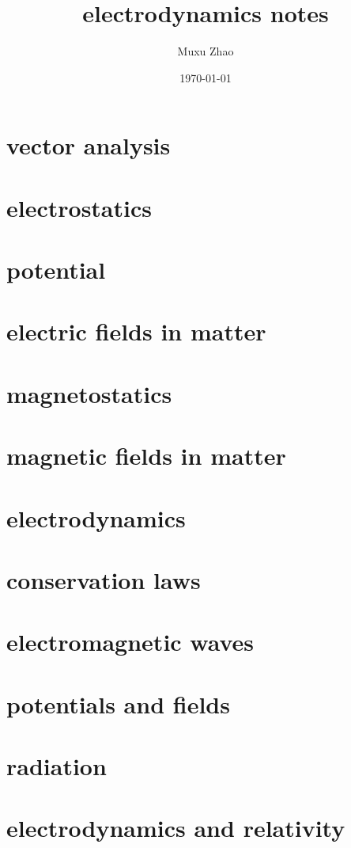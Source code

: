 \documentclass{article}
\title{electrodynamics notes}
\author{Muxu Zhao}
\date{\today}
\begin{document}
\linespread{2.0}
\large
\tableofcontents

\newpage
\section{vector analysis}

\newpage
\section{electrostatics}

\newpage
\section{potential}

\newpage
\section{electric fields in matter}

\newpage
\section{magnetostatics}

\newpage
\section{magnetic fields in matter}

\newpage
\section{electrodynamics}

\newpage
\section{conservation laws}

\newpage
\section{electromagnetic waves}

\newpage
\section{potentials and fields}

\newpage
\section{radiation}

\newpage\newpage
\section{electrodynamics and relativity}
\end{document}
